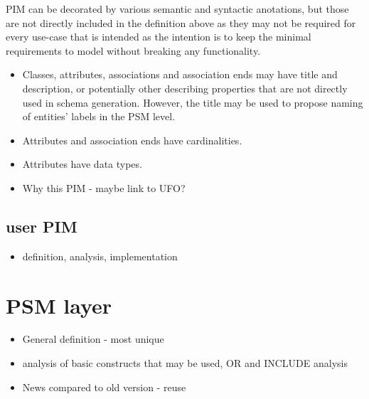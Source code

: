 PIM can be decorated by various semantic and syntactic anotations, but those are not directly included in the definition above as they may not be required for every use-case that is intended as the intention is to keep the minimal requirements to model without breaking any functionality.

\begin{itemize}
    \item Classes, attributes, associations and association ends may have title and description, or potentially other describing properties that are not directly used in schema generation. However, the title may be used to propose naming of entities' labels in the PSM level.
    \item Attributes and association ends have cardinalities.
    \item Attributes have data types.
\end{itemize}

\begin{itemize}
    \item Why this PIM - maybe link to UFO?
\end{itemize}

\subsection{user PIM}

\begin{itemize}
    \item definition, analysis, implementation
\end{itemize}

\section{PSM layer}

\begin{itemize}
    \item General definition - most unique
    \item analysis of basic constructs that may be used, OR and INCLUDE analysis
    \item News compared to old version - reuse
\end{itemize}